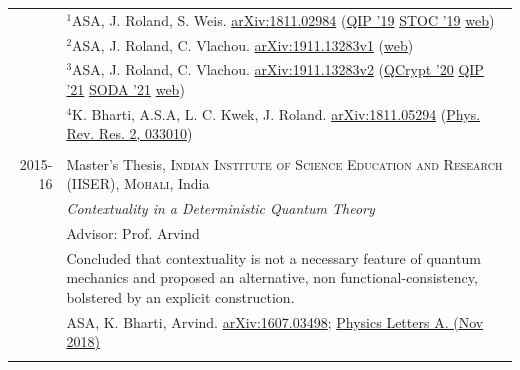 \documentclass[a4paper,10pt]{article}
\begin{document}
\begin{longtable}{r|p{11cm}}
                    &\small{{\tiny $^1$}ASA, J. Roland, S. Weis. \href{https://arxiv.org/abs/1811.02984}{arXiv:1811.02984} (\href{https://www.youtube.com/watch?v=eNK6X7BlG5U&list=PLGdMsPGuoD25wLgnY7RBoTAxsnQEMsNA0&index=12}{QIP '19} \href{http://dx.doi.org/10.1145/3313276.3316306}{STOC '19} \href{https://atulsingharora.github.io/WCF}{web}) }\\
                    &\small{{\tiny $^2$}ASA, J. Roland, C. Vlachou. \href{https://arxiv.org/abs/1911.13283v1}{arXiv:1911.13283v1}} (\href{https://atulsingharora.github.io/WCF_2}{web})\\
                    &\small{{\tiny $^3$}ASA, J. Roland, C. Vlachou. \href{https://arxiv.org/abs/1911.13283v2}{arXiv:1911.13283v2} (\href{https://youtu.be/A2GRxspzWUg?t=801}{QCrypt '20} \href{https://youtu.be/nlZ5JhoE0D8}{QIP '21} \href{https://doi.org/10.1137/1.9781611976465.58}{SODA '21} \href{https://atulsingharora.github.io/WCF_2}{web}})\\
                    &\small{{\tiny $^4$}K. Bharti, A.S.A, L. C. Kwek, J. Roland. \href{https://arxiv.org/abs/1811.05294}{arXiv:1811.05294} (\href{https://link.aps.org/doi/10.1103/PhysRevResearch.2.033010}{Phys. Rev. Res. 2, 033010}) }\\
  \\

 \textsc{2015-16} & Master's Thesis, \textsc{Indian Institute of Science Education and Research (IISER), Mohali}, India \\
                  &\emph{Contextuality in a Deterministic Quantum Theory}\\
                  &\small Advisor: Prof. Arvind\\ 
                  &\footnotesize{Concluded that contextuality is not a necessary feature of quantum mechanics and proposed an alternative, non functional-consistency, bolstered by an explicit construction.}\\
                  &\small{ASA, K. Bharti, Arvind. \href{https://arxiv.org/abs/1607.03498}{arXiv:1607.03498}; \href{https://doi.org/10.1016/j.physleta.2018.11.049}{Physics Letters A. (Nov 2018)} }\\            
 \\


\end{longtable}
\end{document}
